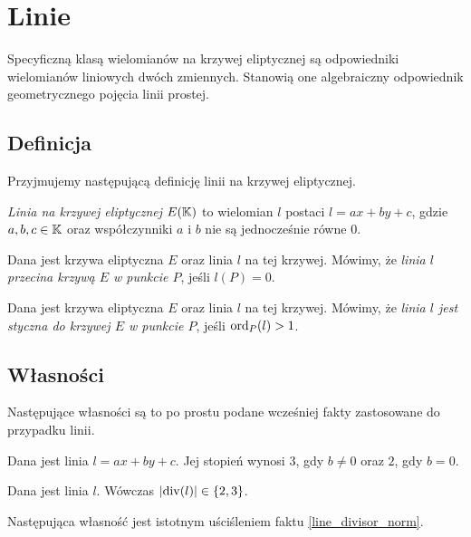 \section{Linie}

Specyficzną klasą wielomianów na krzywej eliptycznej
są odpowiedniki wielomianów liniowych dwóch zmiennych.
Stanowią one algebraiczny odpowiednik
geometrycznego pojęcia linii prostej.

\subsection*{Definicja}

Przyjmujemy następującą definicję linii na krzywej eliptycznej.

\begin{definition}
\emph{Linia na krzywej eliptycznej $E(\mathbb{K})$}
to wielomian $l$ postaci $l = ax + by +c$,
gdzie $a, b, c \in \mathbb{K}$
oraz współczynniki $a$ i $b$ nie są jednocześnie równe $0$.
\end{definition}

\begin{definition}
Dana jest krzywa eliptyczna $E$ oraz linia $l$ na tej krzywej.
Mówimy, że \emph{linia $l$ przecina krzywą $E$ w punkcie $P$},
jeśli $l(P) = 0$.
\end{definition}

\begin{definition}
Dana jest krzywa eliptyczna $E$ oraz linia $l$ na tej krzywej.
Mówimy, że \emph{linia $l$ jest styczna do krzywej $E$ w punkcie $P$},
jeśli $\operatorname{ord}_P(l) > 1$.
\end{definition}

\subsection*{Własności}

Następujące własności są to po prostu podane wcześniej fakty
zastosowane do przypadku linii.

\begin{fact}
Dana jest linia $l = ax + by + c$.
Jej stopień wynosi $3$, gdy $b \neq 0$
oraz $2$, gdy $b = 0$.
\end{fact}

\begin{fact}\label{line_divisor_norm}
Dana jest linia $l$.
Wówczas $\lvert\operatorname{div}(l)\rvert \in \{2,3\}$.
\end{fact}

Następująca własność jest istotnym uściśleniem faktu \ref{line_divisor_norm}.

